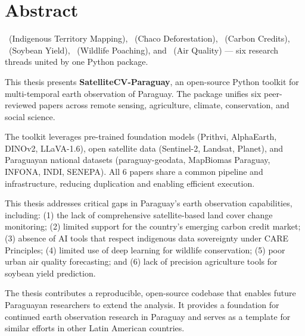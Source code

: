 
\chapter*{Abstract}

\yvy\ (Indigenous Territory Mapping), \yvytu\ (Chaco Deforestation), \yvyra\ (Carbon Credits), \yrupe\ (Soybean Yield), \kai\ (Wildlife Poaching), and \tatakua\ (Air Quality) — six research threads united by one Python package.

This thesis presents \textbf{SatelliteCV-Paraguay}, an open-source Python toolkit for multi-temporal earth observation of Paraguay. The package unifies six peer-reviewed papers across remote sensing, agriculture, climate, conservation, and social science.

The toolkit leverages pre-trained foundation models (Prithvi, AlphaEarth, DINOv2, LLaVA-1.6), open satellite data (Sentinel-2, Landsat, Planet), and Paraguayan national datasets (paraguay-geodata, MapBiomas Paraguay, INFONA, INDI, SENEPA). All 6 papers share a common pipeline and infrastructure, reducing duplication and enabling efficient execution.

This thesis addresses critical gaps in Paraguay's earth observation capabilities, including: (1) the lack of comprehensive satellite-based land cover change monitoring; (2) limited support for the country's emerging carbon credit market; (3) absence of AI tools that respect indigenous data sovereignty under CARE Principles; (4) limited use of deep learning for wildlife conservation; (5) poor urban air quality forecasting; and (6) lack of precision agriculture tools for soybean yield prediction.

The thesis contributes a reproducible, open-source codebase that enables future Paraguayan researchers to extend the analysis. It provides a foundation for continued earth observation research in Paraguay and serves as a template for similar efforts in other Latin American countries.
